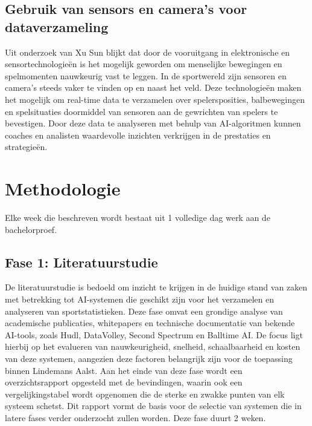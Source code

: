 
\subsection{Gebruik van sensors en camera's voor dataverzameling}
Uit onderzoek van Xu Sun \textcite{Sun2021} blijkt dat door de vooruitgang in elektronische en sensortechnologieën is het mogelijk geworden om menselijke bewegingen en spelmomenten nauwkeurig vast te leggen. In de sportwereld zijn sensoren en camera's steeds vaker te vinden op en naast het veld. Deze technologieën maken het mogelijk om real-time data te verzamelen over spelersposities, balbewegingen en spelsituaties doormiddel van sensoren aan de gewrichten van spelers te bevestigen. Door deze data te analyseren met behulp van AI-algoritmen kunnen coaches en analisten waardevolle inzichten verkrijgen in de prestaties en strategieën.

\section{Methodologie}%
\label{sec:methodologie}

Elke week die beschreven wordt bestaat uit 1 volledige dag werk aan de bachelorproef.
\subsection{Fase 1: Literatuurstudie}
De literatuurstudie is bedoeld om inzicht te krijgen in de huidige stand van zaken met betrekking tot AI-systemen die geschikt zijn voor het verzamelen en analyseren van sportstatistieken. Deze fase omvat een grondige analyse van academische publicaties, whitepapers en technische documentatie van bekende AI-tools, zoals Hudl, DataVolley, Second Spectrum en Balltime AI. De focus ligt hierbij op het evalueren van nauwkeurigheid, snelheid, schaalbaarheid en kosten van deze systemen, aangezien deze factoren belangrijk zijn voor de toepassing binnen Lindemans Aalst. Aan het einde van deze fase wordt een overzichtsrapport opgesteld met de bevindingen, waarin ook een vergelijkingstabel wordt opgenomen die de sterke en zwakke punten van elk systeem schetst. Dit rapport vormt de basis voor de selectie van systemen die in latere fases verder onderzocht zullen worden. Deze fase duurt 2 weken.
